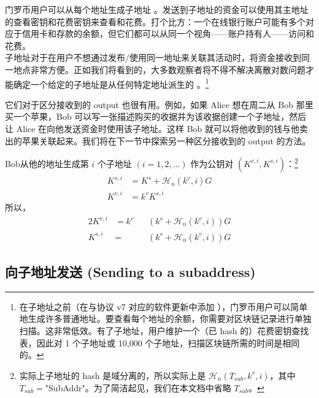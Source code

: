 门罗币用户可以从每个地址生成子地址 \cite{MRL-0006-subaddresses}。发送到子地址的资金可以使用其主地址的查看密钥和花费密钥来查看和花费。打个比方：一个在线银行账户可能有多个对应于信用卡和存款的余额，但它们都可以从同一个视角——账户持有人——访问和花费。\\

子地址对于在用户不想通过发布/使用同一地址来关联其活动时，将资金接收到同一地点非常方便。正如我们将看到的，大多数观察者将不得不解决离散对数问题才能确定一个给定的子地址是从任何特定地址派生的 \cite{MRL-0006-subaddresses}。\footnote{在子地址之前（在与协议 v7 对应的软件更新中添加 \cite{subaddress-pull-request}），门罗币用户可以简单地生成许多普通地址。要查看每个地址的余额，你需要对区块链记录进行单独扫描。这非常低效。有了子地址，用户维护一个（已 hash 的）花费密钥查找表，因此对 1 个子地址或 10,000 个子地址，扫描区块链所需的时间是相同的。}

它们对于区分接收到的 output 也很有用。例如，如果 Alice 想在周二从 Bob 那里买一个苹果，Bob 可以写一张描述购买的收据并为该收据创建一个子地址，然后让 Alice 在向他发送资金时使用该子地址。这样 Bob 就可以将他收到的钱与他卖出的苹果关联起来。我们将在下一节中探索另一种区分接收到的 output 的方法。%

Bob从他的地址生成第 $i$ 个子地址 $(i = 1, 2, ...)$ 作为公钥对 $(K^{v,i}, K^{s,i})$：\footnote{实际上子地址的 hash 是域分离的，所以实际上是 $\mathcal{H}_n(T_{sub},k^v,i)$，其中 $T_{sub} = $"SubAddr"。为了简洁起见，我们在本文档中省略 $T_{sub}$。}\vspace{.175cm}
\begin{align*}
    K^{s,i} &= K^s + \mathcal{H}_n(k^v, i) G\\
    K^{v,i} &= k^v K^{s,i}
\end{align*}
\quad 所以，
\begin{alignat*}{2}
    K^{v,i} &= k^v&&(k^s + \mathcal{H}_n(k^v, i))G\\
    K^{s,i} &= &&(k^s + \mathcal{H}_n(k^v, i))G
\end{alignat*}
    

\subsection{向子地址发送 (Sending to a subaddress)}
    
